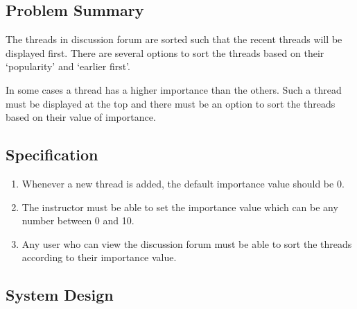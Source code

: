 \subsection*{Problem Summary}

\hspace{0.35cm} The threads in discussion forum are sorted such that the recent threads will be displayed first. There are several options to sort the threads based on their `popularity' and `earlier first'.
\par In some cases a thread has a higher importance than the others. Such a thread must be displayed at the top and there must be an option to sort the threads based on their value of importance.

\subsection*{Specification}

\begin{enumerate}
	\item Whenever a new thread is added, the default importance value should be 0.
	\item The instructor must be able to set the importance value which can be any number between 0 and 10.
	\item Any user who can view the discussion forum must be able to sort the threads according to their importance value.
\end{enumerate}

\subsection*{System Design}


